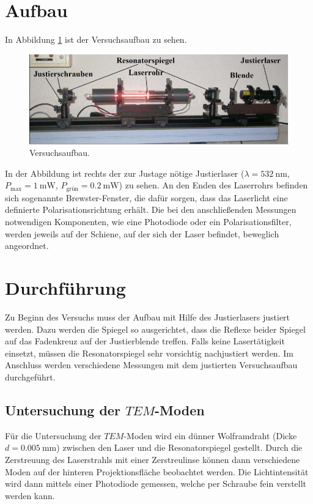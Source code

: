 \section{Aufbau}
\label{sec:Aufbau}
In Abbildung \ref{fig:Versuchsaufbau} ist der Versuchsaufbau zu sehen.

    \begin{figure}[H]
        \centering
        \includegraphics[width=1\textwidth]{images/HeNeAufbau.JPG}
        \caption{Versuchsaufbau. \cite{V61}}
        \label{fig:Versuchsaufbau}
    \end{figure}

\noindent
In der Abbildung ist rechts der zur Justage nötige Justierlaser ($\lambda = \SI{532}{\nano\metre}$, 
$P_\text{max} = \SI{1}{\milli\watt}$, $P_\text{grün} = \SI{0.2}{\milli\watt}$) zu sehen.    
An den Enden des Laserrohrs befinden sich sogenannte Brewster-Fenster, die dafür sorgen, dass das Laserlicht eine definierte Polarisationsrichtung erhält. Die bei den anschließenden Messungen notwendigen Komponenten, wie eine Photodiode oder ein Polarisationsfilter, werden jeweils auf der Schiene, auf der sich der Laser befindet, beweglich angeordnet.

\section{Durchführung}
\label{sec:Durchführung}
Zu Beginn des Versuchs muss der Aufbau mit Hilfe des Justierlasers justiert werden. Dazu werden die Spiegel so ausgerichtet, dass die Reflexe beider Spiegel auf das Fadenkreuz auf der Justierblende treffen. Falls keine Lasertätigkeit einsetzt, müssen die Resonatorspiegel sehr vorsichtig nachjustiert werden. Im Anschluss werden verschiedene Messungen mit dem justierten Versuchsaufbau durchgeführt.

\subsection{Untersuchung der $TEM$-Moden}

Für die Untersuchung der $TEM$-Moden wird ein dünner Wolframdraht (Dicke $d = \SI{0.005}{\milli\metre}$) zwischen den Laser und die Resonatorspiegel
gestellt. Durch die Zerstreuung des Laserstrahls mit einer Zerstreulinse können dann verschiedene Moden auf der hinteren Projektionsfläche beobachtet werden. Die Lichtintensität wird dann mittels einer Photodiode gemessen, welche per Schraube fein verstellt werden kann.

